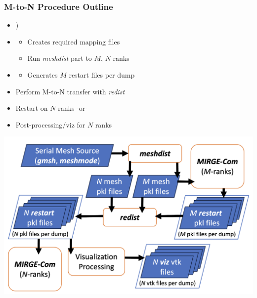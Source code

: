 \begin{frame}\frametitle{M-to-N Procedure Outline}
\begin{minipage}{0.49\textwidth}
\begin{itemize}
\item {)}
\item {\color{lightgray}{Create the target decompositions $M$,$N$}}
  \begin{itemize}
  \color{lightgray}
  \item Creates required mapping files
  \item Run \textit{meshdist} part to $M$, $N$ ranks
  \end{itemize}
\item {}
  \begin{itemize}
    \color{lightgray}
  \item Generates $M$ restart files per dump
  \end{itemize}
\item Perform M-to-N transfer with \textit{redist}
\color{lightgray}
\item Restart \mirgecom{} on $N$ ranks -or-
\item Post-processing/viz for $N$ ranks
\end{itemize}
\end{minipage}
\hfill
\begin{minipage}{.49\textwidth}
\includegraphics[width=\textwidth]{Figures/mtc/redist_data_flow_full.png}
\end{minipage}
\end{frame}

